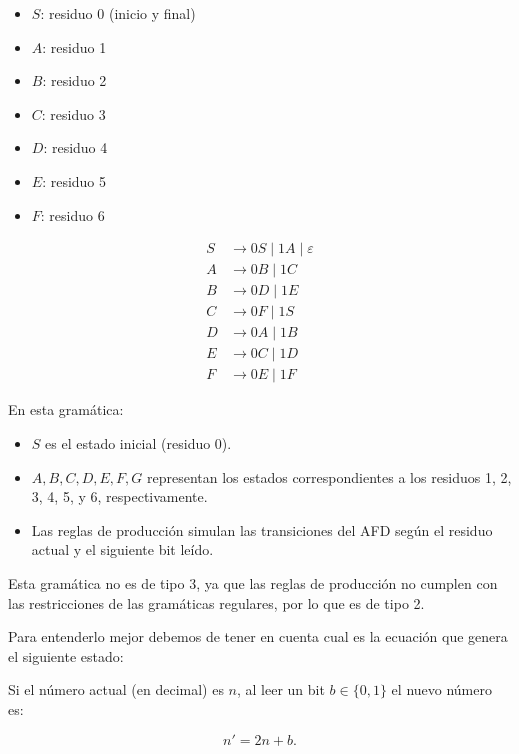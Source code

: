 \documentclass[12pt]{report} %
\begin{document}
\begin{ejercicio}
\begin{itemize}
\begin{itemize}
\begin{solucion}[difícil.b]
        \begin{itemize}
            \item $S$: residuo 0 (inicio y final)
            \item $A$: residuo 1
            \item $B$: residuo 2
            \item $C$: residuo 3
            \item $D$: residuo 4
            \item $E$: residuo 5
            \item $F$: residuo 6
        \end{itemize}

        \begin{align*}
        S &\rightarrow 0S \mid 1A \mid \varepsilon \\
        A &\rightarrow 0B \mid 1C \\
        B &\rightarrow 0D \mid 1E \\
        C &\rightarrow 0F \mid 1S \\
        D &\rightarrow 0A \mid 1B \\
        E &\rightarrow 0C \mid 1D \\
        F &\rightarrow 0E \mid 1F
        \end{align*}

        En esta gramática: 
        
        \begin{itemize}
            \item $S$ es el estado inicial (residuo 0).
            \item $A, B, C, D, E, F, G$ representan los estados correspondientes a los residuos 1, 2, 3, 4, 5, y 6, respectivamente.
            \item Las reglas de producción simulan las transiciones del AFD según el residuo actual y el siguiente bit leído.
        \end{itemize}

        Esta gramática no es de tipo 3, ya que las reglas de producción no cumplen con las restricciones de las gramáticas regulares, por lo que es de tipo 2.

        Para entenderlo mejor debemos de tener en cuenta cual es la ecuación que genera el siguiente estado:


        Si el número actual (en decimal) es $n$, al leer un bit $b \in \{0, 1\}$ el nuevo número es:

        $$
        n' = 2n + b.
        $$


\end{solucion}
\end{itemize}
\end{itemize}
\end{ejercicio}
\end{document}
